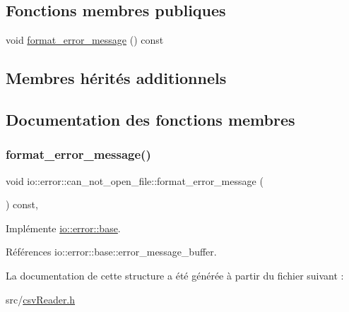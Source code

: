\subsection*{Fonctions membres publiques}
\begin{DoxyCompactItemize}
\item 
void \hyperlink{structio_1_1error_1_1can__not__open__file_a0249122edaf123e9fa4baabe8128806c}{format\+\_\+error\+\_\+message} () const
\end{DoxyCompactItemize}
\subsection*{Membres hérités additionnels}


\subsection{Documentation des fonctions membres}
\mbox{\label{structio_1_1error_1_1can__not__open__file_a0249122edaf123e9fa4baabe8128806c}} 
\subsubsection{\texorpdfstring{format\+\_\+error\+\_\+message()}{format\_error\_message()}}
{\footnotesize\ttfamily void io\+::error\+::can\+\_\+not\+\_\+open\+\_\+file\+::format\+\_\+error\+\_\+message (\begin{DoxyParamCaption}{ }\end{DoxyParamCaption}) const\hspace{0.3cm}{\ttfamily [inline]}, {\ttfamily [virtual]}}



Implémente \hyperlink{structio_1_1error_1_1base_a7d9ff6a31b716a24f056cf8a3e15191d}{io\+::error\+::base}.



Références io\+::error\+::base\+::error\+\_\+message\+\_\+buffer.



La documentation de cette structure a été générée à partir du fichier suivant \+:\begin{DoxyCompactItemize}
\item 
src/\hyperlink{csvReader_8h}{csv\+Reader.\+h}\end{DoxyCompactItemize}
